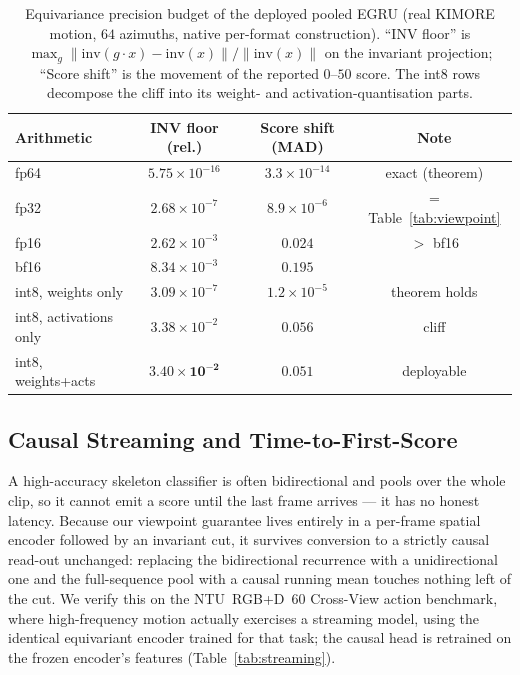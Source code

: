 \documentclass[10pt,journal]{IEEEtran}
\begin{document}
\begin{table}[!t]
\centering
\caption{Equivariance precision budget of the deployed pooled EGRU (real KIMORE motion, $64$
azimuths, native per-format construction). ``INV floor'' is
$\max_g\lVert\mathrm{inv}(g\cdot x)-\mathrm{inv}(x)\rVert/\lVert\mathrm{inv}(x)\rVert$ on the
invariant projection; ``Score shift'' is the movement of the reported $0$--$50$ score. The int8 rows
decompose the cliff into its weight- and activation-quantisation parts.}
\label{tab:precision}
\scriptsize
\setlength{\tabcolsep}{4pt}
\begin{tabular}{lccc}
\toprule
Arithmetic & INV floor (rel.) & Score shift (MAD) & Note \\
\midrule
fp64 & $5.75\times10^{-16}$ & $3.3\times10^{-14}$ & exact (theorem) \\
fp32 & $2.68\times10^{-7}$  & $8.9\times10^{-6}$  & = Table~\ref{tab:viewpoint} \\
fp16 & $2.62\times10^{-3}$  & $0.024$             & $>$ bf16 \\
bf16 & $8.34\times10^{-3}$  & $0.195$             & \\
\midrule
int8, weights only      & $3.09\times10^{-7}$ & $1.2\times10^{-5}$ & theorem holds \\
int8, activations only  & $3.38\times10^{-2}$ & $0.056$           & cliff \\
int8, weights+acts      & $\mathbf{3.40\times10^{-2}}$ & $\mathbf{0.051}$ & deployable \\
\bottomrule
\end{tabular}
\end{table}

\subsection{Causal Streaming and Time-to-First-Score}
\label{sec:deploy:streaming}

A high-accuracy skeleton classifier is often bidirectional and pools over the whole clip, so it
cannot emit a score until the last frame arrives --- it has no honest latency. Because our viewpoint
guarantee lives entirely in a per-frame spatial encoder followed by an invariant cut, it survives
conversion to a strictly causal read-out unchanged: replacing the bidirectional recurrence with a
unidirectional one and the full-sequence pool with a causal running mean touches nothing left of the
cut. We verify this on the NTU~RGB+D~$60$ Cross-View action benchmark, where high-frequency motion
actually exercises a streaming model, using the identical equivariant encoder trained for that task;
the causal head is retrained on the frozen encoder's features (Table~\ref{tab:streaming}).
\end{document}
